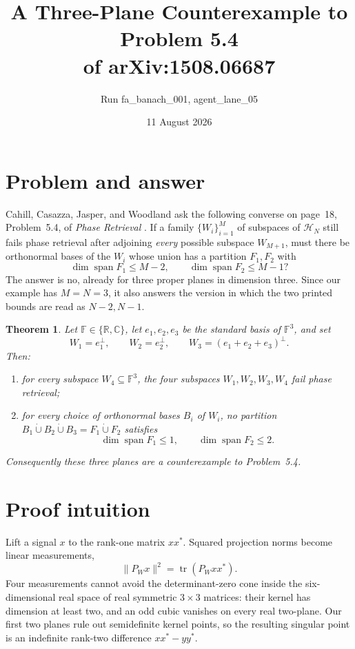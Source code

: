 \documentclass[11pt]{article}
\title{A Three-Plane Counterexample to Problem 5.4\\
of arXiv:1508.06687}
\author{Run fa\_banach\_001, agent\_lane\_05}
\date{11 August 2026}
\newtheorem{theorem}{Theorem}
\newcommand{\F}{\mathbb F}
\newcommand{\R}{\mathbb R}
\newcommand{\C}{\mathbb C}
\newcommand{\tr}{\operatorname{tr}}
\newcommand{\spn}{\operatorname{span}}
\begin{document}
\maketitle

\section*{Problem and answer}

Cahill, Casazza, Jasper, and Woodland ask the following converse on page~18,
Problem~5.4, of \emph{Phase Retrieval} \cite{CCJW}.  If a family
$\{W_i\}_{i=1}^M$ of subspaces of $\mathcal H_N$ still fails phase retrieval
after adjoining \emph{every} possible subspace $W_{M+1}$, must there be
orthonormal bases of the $W_i$ whose union has a partition $F_1,F_2$ with
\[
 \dim\spn F_1\le M-2,
 \qquad
 \dim\spn F_2\le M-1?
\]
The answer is no, already for three proper planes in dimension three.  Since
our example has $M=N=3$, it also answers the version in which the two printed
bounds are read as $N-2,N-1$.

\begin{theorem}\label{thm:main}
Let $\F\in\{\R,\C\}$, let $e_1,e_2,e_3$ be the standard basis of $\F^3$,
and set
\[
 W_1=e_1^\perp,
 \qquad W_2=e_2^\perp,
 \qquad W_3=(e_1+e_2+e_3)^\perp.
\]
Then:
\begin{enumerate}
\item for every subspace $W_4\subseteq\F^3$, the four subspaces
      $W_1,W_2,W_3,W_4$ fail phase retrieval;
\item for every choice of orthonormal bases $B_i$ of $W_i$, no partition
      $B_1\mathbin{\dot\cup}B_2\mathbin{\dot\cup}B_3=F_1\mathbin{\dot\cup}F_2$
      satisfies
      \[
        \dim\spn F_1\le1,
        \qquad
        \dim\spn F_2\le2.
      \]
\end{enumerate}
Consequently these three planes are a counterexample to Problem~5.4.
\end{theorem}

\section*{Proof intuition}

Lift a signal $x$ to the rank-one matrix $xx^*$.  Squared projection norms
become linear measurements,
\[
 \|P_Wx\|^2=\tr(P_Wxx^*).
\]
Four measurements cannot avoid the determinant-zero cone inside the
six-dimensional real space of real symmetric $3\times3$ matrices: their
kernel has dimension at least two, and an odd cubic vanishes on every real
two-plane.  Our first two planes rule out semidefinite kernel points, so the
resulting singular point is an indefinite rank-two difference $xx^*-yy^*$.
\end{document}
